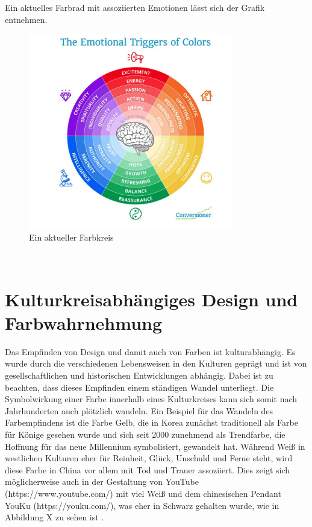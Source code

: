 \documentclass[./dokumentation.tex]{subfiles}
\begin{document}
Ein aktuelles Farbrad mit assoziierten Emotionen lässt sich der Grafik entnehmen. \\

\begin{figure}[H]
    \centering
    \includegraphics[width=0.8\textwidth]{bilder/farbkreis.png}
    \caption{Ein aktueller Farbkreis \cite{DesignEmo2003}}
    \label{fig9:farbkreis}
\end{figure}\\

\pagebreak

\section{Kulturkreisabhängiges Design und Farbwahrnehmung}
Das Empfinden von Design und damit auch von Farben ist kulturabhängig. Es wurde durch die verschiedenen Lebensweisen in den Kulturen geprägt und ist von gesellschaftlichen und historischen Entwicklungen abhängig. Dabei ist zu beachten, dass dieses Empfinden einem ständigen Wandel unterliegt. Die Symbolwirkung einer Farbe innerhalb eines Kulturkreises kann sich somit nach Jahrhunderten auch plötzlich wandeln. Ein Beispiel für das Wandeln des Farbempfindens ist die Farbe Gelb, die in Korea zunächst traditionell als Farbe für Könige gesehen wurde und sich seit 2000 zunehmend als Trendfarbe, die Hoffnung für das neue Millennium symbolisiert, gewandelt hat. Während Weiß in westlichen Kulturen eher für Reinheit, Glück, Unschuld und Ferne steht, wird diese Farbe in China vor allem mit Tod und Trauer assoziiert. Dies zeigt sich möglicherweise auch in der Gestaltung von YouTube (https://www.youtube.com/) mit viel Weiß und dem chinesischen Pendant YouKu (https://youku.com/), was eher in Schwarz gehalten wurde, wie in Abbildung X zu sehen ist \cite{Kunzer2016}.  \pagebreak
\end{document}
